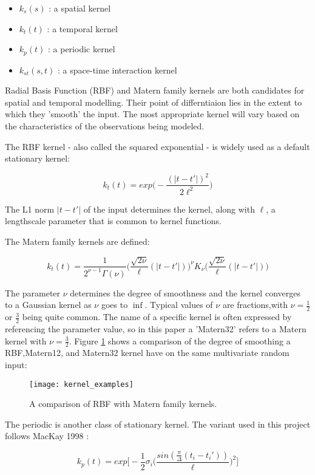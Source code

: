 \begin{itemize}
  \item $k_s(s)$ : a spatial kernel
  \item $k_t(t)$ : a temporal kernel
  \item $k_p(t)$ : a periodic kernel
  \item $k_{st}(s,t)$ : a space-time interaction kernel
\end{itemize}

Radial Basis Function (RBF) and Matern family kernels are both candidates for spatial and temporal modelling. Their point of differntiaion lies in the extent to which they 'smooth' the input. The most appropriate kernel will vary based on the characteristics of the observations being modeled.

The RBF kernel - also called the squared exponential - is widely used as a default stationary kernel:

$$ k_t(t) = exp\big(- \frac{(|t-t'|)^2}{2\ell^2}\big) $$

The L1 norm $|t-t'|$ of the input determines the kernel, along with $\ell$,  a lengthscale parameter that is common to kernel functions.

The Matern family kernels are defined:

$$ k_t(t) = \frac{1}{2^{\nu - 1}\Gamma(\nu)}\big(\frac{\sqrt{2\nu}}{\ell}(|t-t'|)\big)^\nu K_{\nu}\big(\frac{\sqrt{2\nu}}{\ell}(|t-t'|)\big)$$

The parameter $\nu$ determines the degree of smoothness and the kernel converges to a Gaussian kernel as $\nu$ goes to $\inf$. Typical values of $\nu$ are fractions,with $\nu=\frac{1}{2}$ or $\frac{3}{2}$ being quite common. The name of a specific kernel is often expressed by referencing the parameter value, so in this paper a 'Matern32'  refers to a Matern kernel with $\nu=\frac{3}{2}$. Figure \ref{kernel_examples} shows a comparison of the degree of smoothing a RBF,Matern12, and Matern32 kernel have on the same multivariate random input:

\begin{figure}[h!]
  \centering
  \caption{A comparison of RBF with Matern family kernels.}
  \label{kernel_examples}
  \texttt{[image: kernel\_examples]}
\end{figure}


The periodic is another class of stationary kernel. The variant used in this project follows MacKay 1998  \cite{mackay1998introduction}:

$$ k_p(t) = exp \bigg[ - \frac{1}{2}\sigma_i \big(\frac{sin(\frac{\pi}{\Delta}(t_i - t_i'))}{\ell} \big)^2 \bigg] $$


